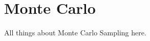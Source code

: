 \documentclass[Thesis.tex]{subfiles}
\begin{document}
\chapter{Monte Carlo}
\label{chp:monte-carlo}

All things about Monte Carlo Sampling here.
\end{document}
